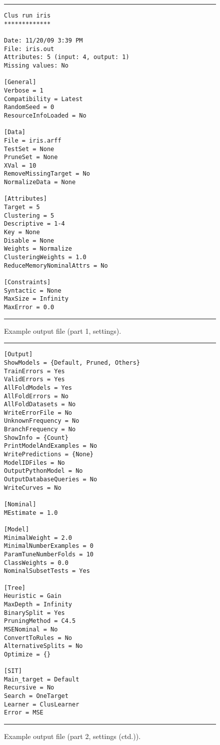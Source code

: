 \begin{figure}
\hrule
\begin{verbatim}
Clus run iris
*************

Date: 11/20/09 3:39 PM
File: iris.out
Attributes: 5 (input: 4, output: 1)
Missing values: No

[General]
Verbose = 1
Compatibility = Latest
RandomSeed = 0
ResourceInfoLoaded = No

[Data]
File = iris.arff
TestSet = None
PruneSet = None
XVal = 10
RemoveMissingTarget = No
NormalizeData = None

[Attributes]
Target = 5
Clustering = 5
Descriptive = 1-4
Key = None
Disable = None
Weights = Normalize
ClusteringWeights = 1.0
ReduceMemoryNominalAttrs = No

[Constraints]
Syntactic = None
MaxSize = Infinity
MaxError = 0.0
\end{verbatim}
\hrule
\caption{Example output file (part 1, settings).}
\label{output1:fig}
\end{figure}

\begin{figure}
\hrule
\small
\begin{verbatim}
[Output]
ShowModels = {Default, Pruned, Others}
TrainErrors = Yes
ValidErrors = Yes
AllFoldModels = Yes
AllFoldErrors = No
AllFoldDatasets = No
WriteErrorFile = No
UnknownFrequency = No
BranchFrequency = No
ShowInfo = {Count}
PrintModelAndExamples = No
WritePredictions = {None}
ModelIDFiles = No
OutputPythonModel = No
OutputDatabaseQueries = No
WriteCurves = No

[Nominal]
MEstimate = 1.0

[Model]
MinimalWeight = 2.0
MinimalNumberExamples = 0
ParamTuneNumberFolds = 10
ClassWeights = 0.0
NominalSubsetTests = Yes

[Tree]
Heuristic = Gain
MaxDepth = Infinity
BinarySplit = Yes
PruningMethod = C4.5
MSENominal = No
ConvertToRules = No
AlternativeSplits = No
Optimize = {}

[SIT]
Main_target = Default
Recursive = No
Search = OneTarget
Learner = ClusLearner
Error = MSE
\end{verbatim}
\hrule
\caption{Example output file (part 2, settings (ctd.)).}
\label{output2:fig}
\end{figure}

